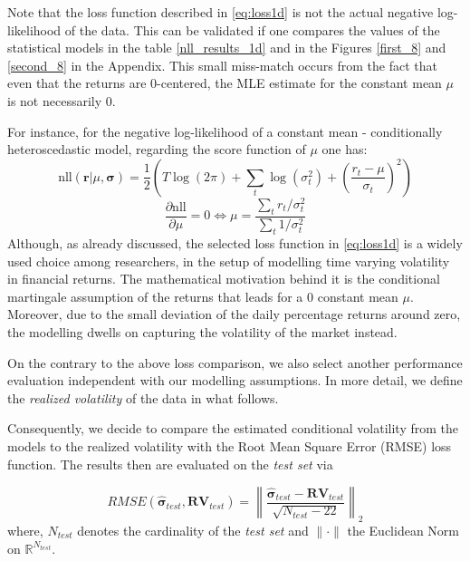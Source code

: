 \documentclass[a4paper, oneside]{discothesis}
\begin{document}
\begin{mdframed}
\begin{remark}
Note that the loss function described in \ref{eq:loss1d} is not the actual negative log-likelihood of the data. This can be validated if one compares the values of the statistical models in the table \ref{nll_results_1d} and in the Figures \ref{first_8} and \ref{second_8} in the Appendix. This small miss-match occurs from the fact that even that the returns are 0-centered, the MLE estimate for the constant mean $\mu$ is not necessarily 0.

For instance, for the negative log-likelihood of a constant mean - conditionally heteroscedastic model, regarding the score function of $\mu$ one has:
\[\text{nll}(\mathbf{r}| \mu, \boldsymbol{\sigma}) = \frac{1}{2}\left(T\log(2\pi)+\sum_{t} \log(\sigma_t^2) + \left(\frac{r_t-\mu}{\sigma_t}\right)^2\right) \]
\[
\frac{\partial \text{nll}}{\partial \mu} = 0 \Leftrightarrow \mu = \frac{\sum_t r_t/\sigma_t^2}{\sum_t 1/\sigma_t^2}
\]
Although, as already discussed, the selected loss function in \ref{eq:loss1d} is a widely used choice among researchers, in the setup of modelling time varying volatility in financial returns. The mathematical motivation behind it is the conditional martingale assumption of the returns that leads for a 0 constant mean $\mu$. Moreover, due to the small deviation of the daily percentage returns around zero, the modelling dwells on capturing the volatility of the market instead.
\end{remark}
\end{mdframed}

On the contrary to the above loss comparison, we also select another performance evaluation independent with our modelling assumptions. In more detail, we define the \textit{realized volatility} of the data in what follows.



Consequently, we decide to compare the estimated conditional volatility from the models to the realized volatility with the Root Mean Square Error (RMSE) loss function. The results then are evaluated on the \textit{test set} via 

\begin{equation}
    RMSE(\hat{\boldsymbol{\sigma}}_{test}, \mathbf{RV}_{test}) = \left\|\frac{\hat{\boldsymbol{\sigma}}_{test}-\mathbf{RV}_{test}}{\sqrt{N_{test}-22}}\right\|_2
\end{equation}
where, $N_{test}$ denotes the cardinality of the \textit{test set} and $\|\cdot\|$ the Euclidean Norm on $\mathbb{R}^{N_{test}}$.
\end{document}
